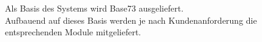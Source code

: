 Als Basis des Systems wird Base73 ausgeliefert.\\
Aufbauend auf dieses Basis werden je nach Kundenanforderung die entsprechenden Module mitgeliefert.

